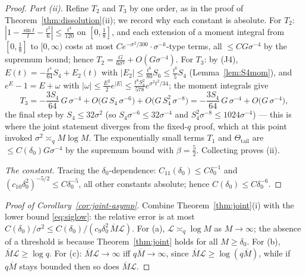 \documentclass[11pt]{article}
\begin{document}
\begin{proof}
\emph{Part (ii).} Refine $T_2$ and $T_3$ by one order, as in the proof
of Theorem~\ref{thm:dissolution}(ii); we record why each constant is
absolute. For $T_2$: $|1-\tfrac{\sin t}t-\tfrac{t^2}6|\le
\tfrac{t^4}{120}$ on $[0,\tfrac18]$, and each extension of a moment
integral from $[0,\tfrac18]$ to $[0,\infty)$ costs at most
$Ce^{-\sigma^2/300}\cdot\sigma^{-k}$-type terms, all $\le CG\sigma^{-4}$
by the supremum bound; hence
$T_2=\tfrac{G}{6\sigma^2}+O(G\sigma^{-4})$. For $T_3$: by (J4),
$E(t)=-\tfrac{t^4}{64}S_4+E_2(t)$ with
$|E_2|\le\tfrac{t^6}{80}S_6\le\tfrac{t^6}{5}S_4$
(Lemma~\ref{lem:S4mom}), and $e^E-1=E+\omega$ with
$|\omega|\le\tfrac{E^2}2e^{|E|}\le\tfrac{t^8S_4^2}{578}
e^{\sigma^2t^2/34}$; the moment integrals give
\[
T_3=-\frac{3S_4}{64}\,G\,\sigma^{-4}
+O\bigl(G\,S_4\,\sigma^{-6}\bigr)
+O\bigl(G\,S_4^{2}\,\sigma^{-8}\bigr)
=-\frac{3S_4}{64}\,G\,\sigma^{-4}+O\bigl(G\,\sigma^{-4}\bigr),
\]
the final step by $S_4\le32\sigma^2$ (so $S_4\sigma^{-6}\le32\sigma^{-4}$
and $S_4^2\sigma^{-8}\le1024\sigma^{-4}$) --- this is where the joint
statement diverges from the fixed-$q$ proof, which at this point
invoked $\sigma^2\asymp_qM\log M$. The exponentially small terms
$T_1$ and $\Theta_{\mathrm{tail}}$ are $\le C(\delta_0)G\sigma^{-4}$
by the supremum bound with $\beta=\tfrac52$. Collecting proves (ii).

\emph{The constant.} Tracing the $\delta_0$-dependence:
$C_{11}(\delta_0)\le C\delta_0^{-1}$ and
$(c_{10}\delta_0^{2})^{-5/2}\le C\delta_0^{-5}$, all other constants
absolute; hence $C(\delta_0)\le C\delta_0^{-6}$.
\end{proof}

\begin{proof}[Proof of Corollary~\ref{cor:joint-asymp}]
Combine Theorem~\ref{thm:joint}(i) with the lower bound
\eqref{eq:siglow}: the relative error is at most
$C(\delta_0)/\sigma^2\le C(\delta_0)/(c_9\delta_0^2\,\overline
M\mathcal L)$. For (a), $\mathcal L\asymp_q\log M$ as $M\to\infty$; the
absence of a threshold is because Theorem~\ref{thm:joint} holds for
all $M\ge\delta_0$. For (b), $\overline M\mathcal L\ge\log q$. For
(c): $\overline M\mathcal L\to\infty$ iff $q\overline M\to\infty$,
since $\overline M\mathcal L\ge\log(q\overline M)$, while if
$q\overline M$ stays bounded then so does $\overline M\mathcal L$.
\end{proof}
\end{document}
